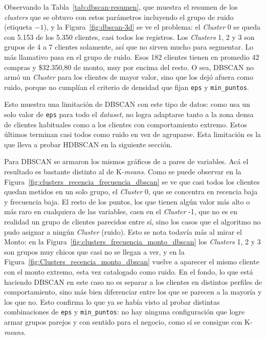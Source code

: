 \documentclass[a4paper,10pts,openany]{book}
\begin{document}
	Observando la Tabla~\ref{tab:dbscan-resumen}, que muestra el resumen de los \emph{clusters} que se obtuvo con estos parámetros incluyendo el grupo de ruido (etiqueta $-1$), y la Figura~\ref{fig:dbscan-3d} se ve el problema: el \emph{Cluster} 0 se queda con 5.153 de los 5.350 clientes, casi todos los registros. Los \emph{Clusters} 1, 2 y 3 son grupos de 4 a 7 clientes solamente, así que no sirven mucho para segmentar. Lo más llamativo pasa en el grupo de ruido. Esos 182 clientes tienen en promedio 42 compras y \$32.350{,}80 de monto, muy por encima del resto. O sea, DBSCAN no armó un \emph{Cluster} para los clientes de mayor valor, sino que los dejó afuera como ruido, porque no cumplían el criterio de densidad que fijan \texttt{eps} y \texttt{min\_puntos}.
	
	Esto muestra una limitación de DBSCAN con este tipo de datos: como usa un solo valor de \texttt{eps} para todo el \emph{dataset}, no logra adaptarse tanto a la zona densa de clientes habituales como a los clientes con comportamiento extremo. Estos últimos terminan casi todos como ruido en vez de agruparse. Esta limitación es la que lleva a probar HDBSCAN en la siguiente sección.
	
	Para DBSCAN se armaron los mismos gráficos de a pares de variables. Acá el resultado es bastante distinto al de K-\emph{means}. Como se puede observar en la Figura~\ref{fig:clusters_recencia_frecuencia_dbscan} se ve que casi todos los clientes quedan metidos en un solo grupo, el \emph{Cluster} 0, que se concentra en recencia baja y frecuencia baja. El resto de los puntos, los que tienen algún valor más alto o más raro en cualquiera de las variables, caen en el \emph{Cluster} -1, que no es en realidad un grupo de clientes parecidos entre sí, sino los casos que el algoritmo no pudo asignar a ningún \emph{Cluster} (ruido). Esto se nota todavía más al mirar el Monto: en la Figura~\ref{fig:clusters_frecuencia_monto_dbscan} los \emph{Clusters} 1, 2 y 3 son grupos muy chicos que casi no se llegan a ver, y en la Figura~\ref{fig:Clusters_recencia_monto_dbscan} vuelve a aparecer el mismo cliente con el monto extremo, esta vez catalogado como ruido.
	En el fondo, lo que está haciendo DBSCAN en este caso no es separar a los clientes en distintos perfiles de comportamiento, sino más bien diferenciar entre los que se parecen a la mayoría y los que no. Esto confirma lo que ya se había visto al probar distintas combinaciones de \texttt{eps} y \texttt{min\_puntos}: no hay ninguna configuración que logre armar grupos parejos y con sentido para el negocio, como sí se consigue con K-\emph{means}.
	
\end{document}
